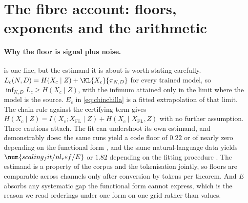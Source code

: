 \section{The fibre account: floors, exponents and the arithmetic}
\label{app:noise}

\paragraph{Why the floor is signal plus noise.}
 is one line, but the estimand it is about is worth stating
carefully.
\(L_c(N,D) = H(X_c\mid Z) + \KL{X_c}{\pi_{N,D}}\) for every trained model, so
\(\inf_{N,D} L_c \ge H(X_c\mid Z)\), with the infimum attained only in the limit
where the model is the source.
\(E_c\) in \cref{eq:chinchilla} is a fitted extrapolation of that limit.
The chain rule against the certifying term gives
\(H(X_c\mid Z) = I(X_c;X_{\mathrm{FL}}\mid Z) + H(X_c\mid X_{\mathrm{FL}}, Z)\)
with no further assumption.
Three cautions attach.
The fit can undershoot its own estimand, and demonstrably does:
the same runs yield a code floor of \(0.22\) or of nearly zero depending on the
functional form \citep{luo2025codescalingdatahungry}, and the same
natural-language data yields \(\num{scaling_fit/nl_ref/E}\) or \(1.82\) depending on the fitting
procedure \citep{besiroglu2024chinchilla}.
The estimand is a property of the corpus and the tokenisation jointly, so floors
are comparable across channels only after conversion by tokens per theorem.
And \(E\) absorbs any systematic gap the functional form cannot express, which
is the reason we read orderings under one form on one grid rather than values.

